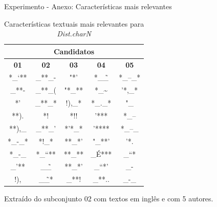 \begin{frame}{Experimento - Anexo: Características mais relevantes}
	\setlength{\tabcolsep}{15pt}\selectFont
	\begin{table}[h]
	\centering
	\caption{\selectFont Características textuais mais relevantes para {\em Dist.charN}}
	\label{tableTop.Std.distN}
	\begin{tabular}{c|c|c|c|c}
		\toprule
		         \multicolumn{5}{c}{\bf Candidatos}          \\ \hline
		{\bf 01} & {\bf 02} & {\bf 03} & {\bf 04} & {\bf 05} \\ \midrule
		 *\_‘**  & \_**\_-  &   "*'    & *\_\~\_  & *\_–\_*  \\
		 \_**-   & \_**\_(  &  "*\_**  &  *\_\~   &  '*,\_*  \\
		   *'    & \_**\_*  &  !),\_*  & *\_.\_*  &   "\_    \\
		  **).   &    *!    &   *!!    &   '***   &   *\_–   \\
		 **),\_  & \_**\_'  &  *'*\_*  &  '****   &  *\_–\_  \\
		*\_-\_*  &  *!\_*   &  **\_*'  &  "\_**'  &   '*.    \\
		 *\_-\_  &  *\_“**  &  **\_**  &  \_É***  &   \_“*   \\
		 \_'**   &  \_\~\_  &  **\_*’  &  \_“*’   &   \_-    \\
		  !),    & \_\~\_*  &  \_**!   &  \_**..  &  \_-\_   \\ \bottomrule
	\end{tabular}
	\end{table}
	{\selectFont Extraído do subconjunto 02 com textos em inglês e com 5 autores.}
\end{frame}


